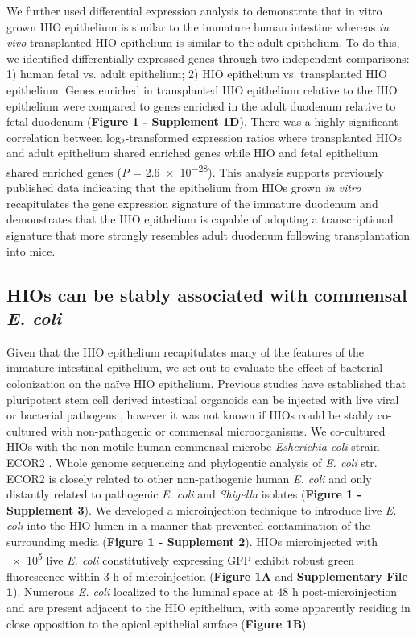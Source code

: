 \documentclass[9pt,lineo]{elife}
\begin{document}
We further used differential expression analysis to demonstrate that in vitro grown HIO epithelium is similar to the immature human intestine whereas \emph{in vivo} transplanted HIO epithelium is similar to the adult epithelium.  To do this, we identified differentially expressed genes through two independent comparisons: 1) human fetal vs. adult epithelium; 2) HIO epithelium vs. transplanted HIO epithelium. Genes enriched in transplanted HIO epithelium relative to the HIO epithelium were compared to genes enriched in the adult duodenum relative to fetal duodenum (\textbf{Figure 1 - Supplement 1D}). There was a highly significant correlation between log\(_{\text{2}}\)-transformed expression ratios where transplanted HIOs and adult epithelium shared enriched genes while HIO and fetal epithelium shared enriched genes  (\emph{P} = \num{2.6e-28}). This analysis supports previously published data indicating that the epithelium from HIOs grown \emph{in vitro} recapitulates the gene expression signature of the immature duodenum and demonstrates that the HIO epithelium is capable of adopting a transcriptional signature that more strongly resembles adult duodenum following transplantation into mice.

\subsection*{{\bfseries\sffamily } HIOs can be stably associated with commensal \emph{E. coli}}
\label{sec:orgheadline3}
Given that the HIO epithelium recapitulates many of the features of the immature intestinal epithelium, we set out to evaluate the effect of bacterial colonization on the na{\"i}ve HIO epithelium. Previous studies have established that pluripotent stem cell derived intestinal organoids can be injected with live viral \citep{Finkbeiner:2012} or bacterial pathogens \citep{Leslie:2015,Engevik:2015,Forbester:2015}, however it was not known if HIOs could be stably co-cultured with non-pathogenic or commensal microorganisms. We co-cultured HIOs with the non-motile human commensal microbe \emph{Esherichia coli} strain ECOR2 \citep{Ochman:1984}. Whole genome sequencing and phylogentic analysis of \emph{E. coli} str. ECOR2 is closely related to other non-pathogenic human \emph{E. coli} and only distantly related to pathogenic \emph{E. coli} and \emph{Shigella} isolates (\textbf{Figure 1 - Supplement 3}). We developed a microinjection technique to introduce live \emph{E. coli} into the HIO lumen in a manner that prevented contamination of the surrounding media (\textbf{Figure 1 - Supplement 2}). HIOs microinjected with \num{e5} live \emph{E. coli} constitutively expressing GFP exhibit robust green fluorescence within 3 h of microinjection (\textbf{Figure 1A} and \textbf{Supplementary File 1}). Numerous \emph{E. coli} localized to the luminal space at 48 h post-microinjection and are present adjacent to the HIO epithelium, with some apparently residing in close opposition to the apical epithelial surface (\textbf{Figure 1B}).
\end{document}
